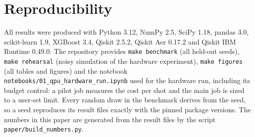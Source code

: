 \section{Reproducibility}\label{app:repro}

All results were produced with Python 3.12, NumPy 2.5, SciPy 1.18, pandas 3.0, scikit-learn 1.9, XGBoost 3.4, Qiskit 2.5.2, Qiskit Aer 0.17.2 and Qiskit IBM Runtime 0.49.0. The repository provides \texttt{make benchmark} (all held-out seeds), \texttt{make rehearsal} (noisy simulation of the hardware experiment), \texttt{make figures} (all tables and figures) and the notebook \texttt{notebooks/01\_qpu\_hardware\_run.ipynb} used for the hardware run, including its budget control: a pilot job measures the cost per shot and the main job is sized to a user-set limit. Every random draw in the benchmark derives from the seed, so a seed reproduces its result files exactly with the pinned package versions. The numbers in this paper are generated from the result files by the script \texttt{paper/build\_numbers.py}.
